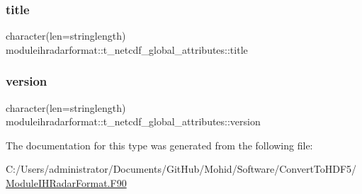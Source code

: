 \subsubsection{\texorpdfstring{title}{title}}
{\footnotesize\ttfamily character(len=stringlength) moduleihradarformat\+::t\+\_\+netcdf\+\_\+global\+\_\+attributes\+::title\hspace{0.3cm}{\ttfamily [private]}}

\mbox{\label{structmoduleihradarformat_1_1t__netcdf__global__attributes_a216a59fd7843c452a8c8b5899264836c}} 
\subsubsection{\texorpdfstring{version}{version}}
{\footnotesize\ttfamily character(len=stringlength) moduleihradarformat\+::t\+\_\+netcdf\+\_\+global\+\_\+attributes\+::version\hspace{0.3cm}{\ttfamily [private]}}



The documentation for this type was generated from the following file\+:\begin{DoxyCompactItemize}
\item 
C\+:/\+Users/administrator/\+Documents/\+Git\+Hub/\+Mohid/\+Software/\+Convert\+To\+H\+D\+F5/\mbox{\hyperlink{_module_i_h_radar_format_8_f90}{Module\+I\+H\+Radar\+Format.\+F90}}\end{DoxyCompactItemize}
